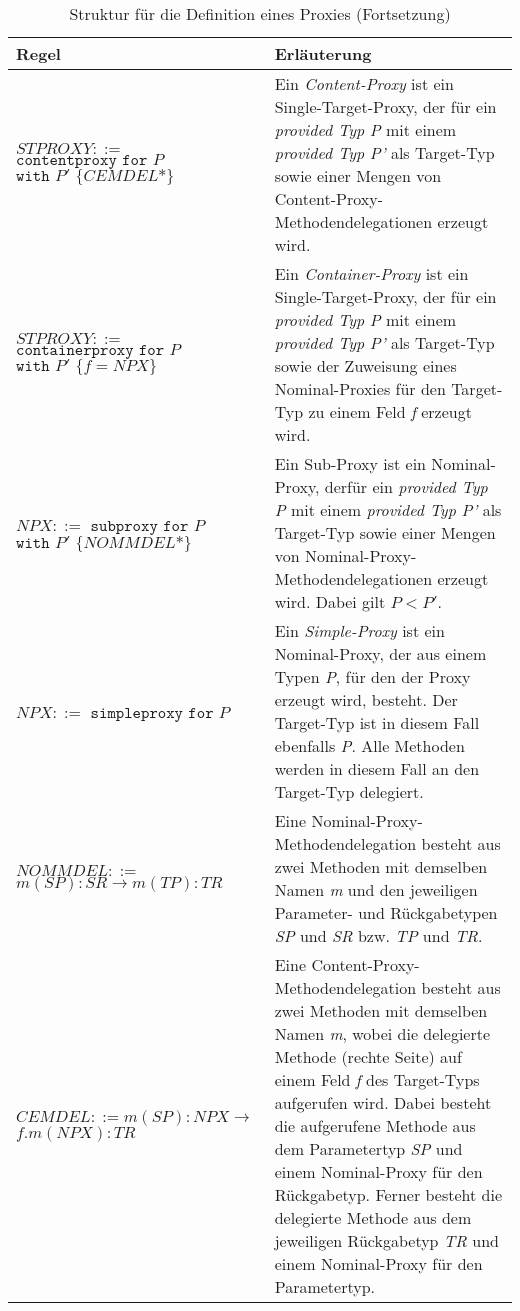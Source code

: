 \documentclass[a4paper,12pt]{article}
\begin{document}
\newpage
\begin{table}[H]
\centering
\begin{tabular}{|p{6cm}|p{8cm}|}
\hline
\centering\textbf{Regel} & \textbf{Erläuterung} \\
\hline
\hline
$\mathit{STPROXY} ::=$\newline $\texttt{contentproxy }  \texttt{for } P$\newline $\texttt{with } P' \texttt{ \{}CEMDEL\texttt{*\}}$ & Ein \emph{Content-Proxy} ist ein Single-Target-Proxy, der für ein \emph{provided Typ P} mit einem \emph{provided Typ P'} als Target-Typ sowie einer Mengen von Content-Proxy-Methodendelegationen erzeugt wird.\\
\hline
$\mathit{STPROXY} ::=$\newline $\texttt{containerproxy} \texttt{ for } P$\newline
$ \texttt{with } P' \texttt{ \{} f = \mathit{NPX} \texttt{\}}$ &  Ein \emph{Container-Proxy} ist ein Single-Target-Proxy, der für ein \emph{provided Typ P} mit einem \emph{provided Typ P'} als Target-Typ sowie der Zuweisung eines Nominal-Proxies für den Target-Typ zu einem Feld \emph{f} erzeugt wird.\\
\hline
$\mathit{NPX} ::=$ \newline $\texttt{subproxy } \texttt{for } P$\newline $\texttt{with } P' \texttt{ \{}\mathit{NOMMDEL}\texttt{*\}}$ & Ein Sub-Proxy ist ein Nominal-Proxy, derfür ein \emph{provided Typ P} mit einem \emph{provided Typ P'} als Target-Typ sowie einer Mengen von Nominal-Proxy-Methodendelegationen erzeugt wird. Dabei gilt $P < P'$.\\
\hline
$\mathit{NPX} ::=$ \newline $\texttt{simpleproxy } \texttt{for } P$ & Ein \emph{Simple-Proxy} ist ein Nominal-Proxy, der aus einem Typen \emph{P}, für den der Proxy erzeugt wird, besteht. Der Target-Typ ist in diesem Fall ebenfalls \emph{P}. Alle Methoden werden in diesem Fall an den Target-Typ delegiert.\\
\hline
$\mathit{NOMMDEL} ::=$\newline
$\mathit{m(SP):SR} \rightarrow \mathit{m(TP):TR} $  & Eine Nominal-Proxy-Methodendelegation besteht aus zwei Methoden mit demselben Namen \emph{m} und den jeweiligen Parameter- und Rückgabetypen \emph{SP} und \emph{SR} bzw. \emph{TP} und \emph{TR}. \\
\hline
$\mathit{CEMDEL} ::= \mathit{m(SP):NPX} \rightarrow$\newline
$\mathit{f.m(NPX):TR} $  & Eine Content-Proxy-Methodendelegation besteht aus zwei Methoden mit demselben Namen \emph{m}, wobei die delegierte Methode (rechte Seite) auf einem Feld \emph{f} des Target-Typs aufgerufen wird. Dabei besteht die aufgerufene Methode aus dem Parametertyp \emph{SP} und einem Nominal-Proxy für den Rückgabetyp. Ferner besteht die delegierte Methode aus dem jeweiligen Rückgabetyp \emph{TR} und einem Nominal-Proxy für den Parametertyp.\\
\hline
\hline
\end{tabular}
\caption{Struktur für die Definition eines Proxies (Fortsetzung)}
 \label{tab:eIShort}
\end{table}
\end{document}
